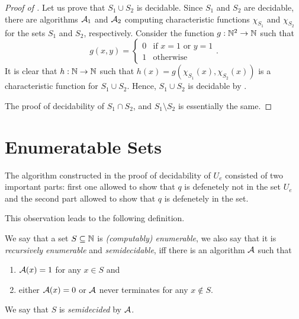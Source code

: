 \begin{proof}[Proof of ]
  Let us prove that $S_1 \cup S_2$ is decidable. Since $S_1$ and $S_2$ are
  decidable, there are algorithms $\mathcal{A}_1$ and $\mathcal{A}_2$
  computing characteristic functions $\chi_{S_1}$ and $\chi_{S_2}$
  for the sets $S_1$ and $S_2$, respectively.
  Consider the function $g : {\mathbb{N}}^2 \to {\mathbb{N}}$ such that
  \[
    g(x, y) = \begin{cases}
      0 & \text{if } x = 1 \text{ or } y = 1 \\
      1 & \text{otherwise}
    \end{cases}.
  \]
  It is clear that $h : {\mathbb{N}} \to {\mathbb{N}}$ such that
  $h(x) = g(\chi_{S_1}(x), \chi_{S_2}(x))$ is a characteristic function for
  $S_1 \cup S_2$. Hence, $S_1 \cup S_2$ is decidable by
  .

  The proof of decidability of $S_1 \cap S_2$, and $S_1 \setminus S_2$
  is essentially the same.
\end{proof}

\section{Enumeratable Sets}
The algorithm constructed in the proof of decidability of $U_e$ consisted of
two important parts: first one allowed to show that $q$ is defenetely not in the
set $U_e$ and the second part allowed to show that $q$ is defenetely in the set.

This observation leads to the following definition.
\begin{definition}
  We say that a set $S \subseteq {\mathbb{N}}$ is \emph{(computably) enumerable},
  we also say that it is \emph{recursively enumerable} and \emph{semidecidable},
  iff there is an algorithm $\mathcal{A}$ such that
  \begin{enumerate}
    \item $\mathcal{A}(x) = 1$ for any $x \in S$ and
    \item either $\mathcal{A}(x) = 0$ or $\mathcal{A}$ never terminates for
      any $x \notin S$.
  \end{enumerate}

  We say that $S$ is \emph{semidecided} by $\mathcal{A}$.
\end{definition}

